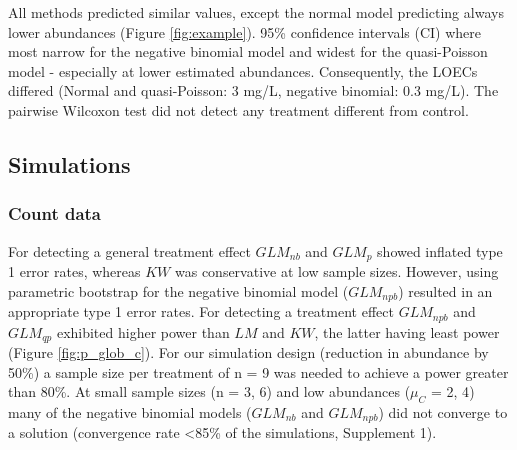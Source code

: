 \documentclass[twocolumn, natbib]{svjour3}
\begin{document}
All methods predicted similar values, except the normal model predicting always lower abundances (Figure \ref{fig:example}). 
95\% confidence intervals (CI) where most narrow for the negative binomial model and widest for the quasi-Poisson model - especially at lower estimated abundances.
Consequently, the LOECs differed (Normal and quasi-Poisson: 3 mg/L, negative binomial: 0.3 mg/L).
The pairwise Wilcoxon test did not detect any treatment different from control.


\subsection{Simulations}
\subsubsection{Count data}
For detecting a general treatment effect $GLM_{nb}$ and $GLM_{p}$ showed inflated type 1 error rates, whereas $KW$ was conservative at low sample sizes.
However, using parametric bootstrap for the negative binomial model ($GLM_{npb}$) resulted in an appropriate type 1 error rates.
For detecting a treatment effect $GLM_{npb}$ and $GLM_{qp}$ exhibited higher power than $LM$ and $KW$, the latter having least power (Figure \ref{fig:p_glob_c}).
For our simulation design (reduction in abundance by 50\%) a sample size per treatment of n = 9 was needed to achieve a power greater than 80\%.
At small sample sizes (n = {3, 6}) and low abundances ($\mu_C$ = {2, 4}) many of the negative binomial models ($GLM_{nb}$ and $GLM_{npb}$) did not converge to a solution (convergence rate \textless 85\% of the simulations, Supplement 1). 
\end{document}
